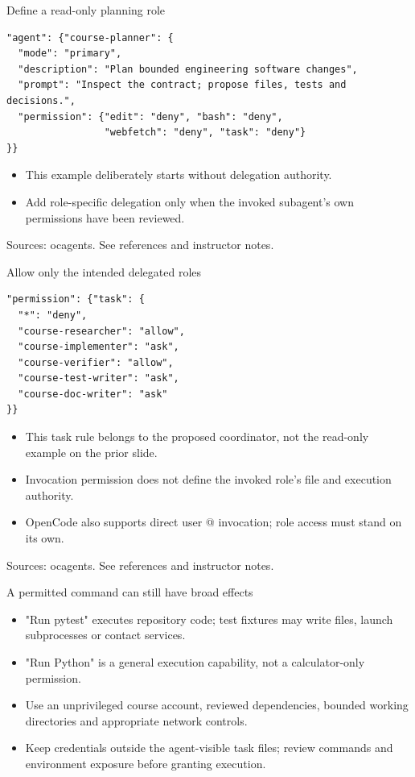 \documentclass[aspectratio=169,11pt]{beamer}
\begin{document}
\begin{frame}[t,fragile]{Define a read-only planning role}
\begin{lstlisting}
"agent": {"course-planner": {
  "mode": "primary",
  "description": "Plan bounded engineering software changes",
  "prompt": "Inspect the contract; propose files, tests and decisions.",
  "permission": {"edit": "deny", "bash": "deny",
                 "webfetch": "deny", "task": "deny"}
}}
\end{lstlisting}
\fontsize{10.5}{12.5}\selectfont
\begin{itemize}\setlength{\itemsep}{2mm}
\item This example deliberately starts without delegation authority.
\item Add role-specific delegation only when the invoked subagent's own permissions have been reviewed.
\end{itemize}
\vfill{\fontsize{6.5}{8}\selectfont\color{UTgray} Sources: ocagents. See references and instructor notes.\par}
\end{frame}
\begin{frame}[t,fragile]{Allow only the intended delegated roles}
\begin{lstlisting}
"permission": {"task": {
  "*": "deny",
  "course-researcher": "allow",
  "course-implementer": "ask",
  "course-verifier": "allow",
  "course-test-writer": "ask",
  "course-doc-writer": "ask"
}}
\end{lstlisting}
\fontsize{10.5}{12.5}\selectfont
\begin{itemize}\setlength{\itemsep}{2mm}
\item This task rule belongs to the proposed coordinator, not the read-only example on the prior slide.
\item Invocation permission does not define the invoked role's file and execution authority.
\item OpenCode also supports direct user @ invocation; role access must stand on its own.
\end{itemize}
\vfill{\fontsize{6.5}{8}\selectfont\color{UTgray} Sources: ocagents. See references and instructor notes.\par}
\end{frame}
\begin{frame}[t,fragile]{A permitted command can still have broad effects}
\fontsize{11.5}{14}\selectfont
\begin{itemize}\setlength{\itemsep}{2mm}
\item "Run pytest" executes repository code; test fixtures may write files, launch subprocesses or contact services.
\item "Run Python" is a general execution capability, not a calculator-only permission.
\item Use an unprivileged course account, reviewed dependencies, bounded working directories and appropriate network controls.
\item Keep credentials outside the agent-visible task files; review commands and environment exposure before granting execution.
\end{itemize}
\end{frame}
\end{document}
